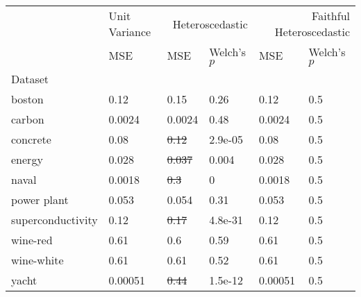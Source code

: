 \begin{tabular}{l|l|ll|ll}
\toprule
 & Unit Variance & \multicolumn{2}{r}{Heteroscedastic} & \multicolumn{2}{r}{Faithful Heteroscedastic} \\
 & MSE & MSE & Welch's $p$ & MSE & Welch's $p$ \\
Dataset &  &  &  &  &  \\
\midrule
boston & 0.12 & 0.15 & 0.26 & 0.12 & 0.5 \\
carbon & 0.0024 & 0.0024 & 0.48 & 0.0024 & 0.5 \\
concrete & 0.08 & \sout{0.12} & 2.9e-05 & 0.08 & 0.5 \\
energy & 0.028 & \sout{0.037} & 0.004 & 0.028 & 0.5 \\
naval & 0.0018 & \sout{0.3} & 0 & 0.0018 & 0.5 \\
power plant & 0.053 & 0.054 & 0.31 & 0.053 & 0.5 \\
superconductivity & 0.12 & \sout{0.17} & 4.8e-31 & 0.12 & 0.5 \\
wine-red & 0.61 & 0.6 & 0.59 & 0.61 & 0.5 \\
wine-white & 0.61 & 0.61 & 0.52 & 0.61 & 0.5 \\
yacht & 0.00051 & \sout{0.44} & 1.5e-12 & 0.00051 & 0.5 \\
\bottomrule
\end{tabular}
